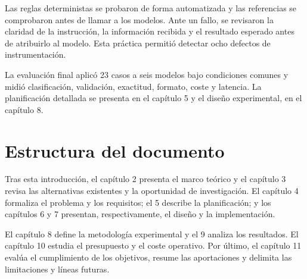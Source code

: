 Las reglas deterministas se probaron de forma automatizada y las referencias se comprobaron antes de llamar a los modelos. Ante un fallo, se revisaron la claridad de la instrucción, la información recibida y el resultado esperado antes de atribuirlo al modelo. Esta práctica permitió detectar ocho defectos de instrumentación.

La evaluación final aplicó 23 casos a seis modelos bajo condiciones comunes y midió clasificación, validación, exactitud, formato, coste y latencia. La planificación detallada se presenta en el capítulo 5 y el diseño experimental, en el capítulo 8.

\section{Estructura del documento}
\label{sec:estructura_documento}

Tras esta introducción, el capítulo 2 presenta el marco teórico y el capítulo 3 revisa las alternativas existentes y la oportunidad de investigación. El capítulo 4 formaliza el problema y los requisitos; el 5 describe la planificación; y los capítulos 6 y 7 presentan, respectivamente, el diseño y la implementación.

El capítulo 8 define la metodología experimental y el 9 analiza los resultados. El capítulo 10 estudia el presupuesto y el coste operativo. Por último, el capítulo 11 evalúa el cumplimiento de los objetivos, resume las aportaciones y delimita las limitaciones y líneas futuras.
